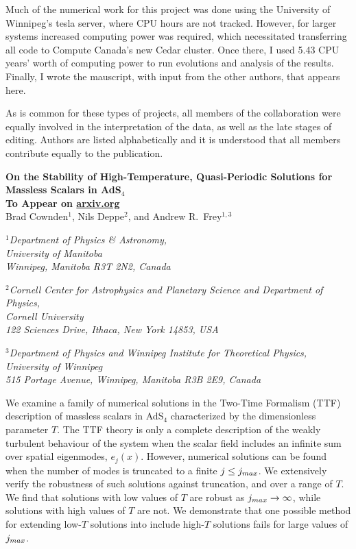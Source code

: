 \documentclass[../PhD.tex]{subfiles}
\begin{document}
Much of the numerical work for this project was done using the University of Winnipeg's tesla server, where CPU hours are not tracked. However, for larger systems increased computing power was required, which necessitated transferring all code to Compute Canada's new Cedar cluster. Once there, I used 5.43 CPU years' worth of computing power to run evolutions and analysis of the results. Finally, I wrote the mauscript, with input from the other authors, that appears here.

As is common for these types of projects, all members of the collaboration were equally involved in the interpretation of the data, as well as the late stages of editing. Authors are listed alphabetically and it is understood that all members contribute equally to the publication.

\newpage


\begin{center}
{\bf{\Large On the Stability of High-Temperature, Quasi-Periodic Solutions for Massless Scalars in AdS$_4$}} \\
\bigskip
{\bf To Appear on \href{https://arxiv.org}{arxiv.org}} \\
\bigskip
\bigskip
Brad Cownden$^1$, Nils Deppe$^2$, and Andrew R.~Frey$^{1,3}$\\
\bigskip

$^1${\it Department of Physics \& Astronomy,\\ University of Manitoba\\
Winnipeg, Manitoba R3T 2N2, Canada}
\vspace{0.1in}

$^2${\it Cornell Center for Astrophysics and Planetary Science and
Department of Physics,\\ Cornell University\\
122 Sciences Drive, Ithaca, New York 14853, USA}
\vspace{0.1in}

$^3${\it Department of Physics and Winnipeg Institute for Theoretical
Physics,\\ University of Winnipeg\\
515 Portage Avenue, Winnipeg, Manitoba R3B 2E9, Canada }
\end{center}

\bigskip

We examine a family of numerical solutions in the Two-Time Formalism (TTF) description of massless scalars in AdS$_4$ characterized by the dimensionless parameter $T$. The TTF theory is only a complete description of the weakly turbulent behaviour of the system when the scalar field includes an infinite sum over spatial eigenmodes, $e_j(x)$. However, numerical solutions can be found when the number of modes is truncated to a finite $j \leq j_{max}$. We extensively verify the robustness of such solutions against truncation, and over a range of $T$. We find that solutions with low values of $T$ are robust as $j_{max} \to \infty$, while solutions with high values of $T$ are not. We demonstrate that one possible method for extending low-$T$ solutions into include high-$T$ solutions fails for large values of $j_{max}$. 
\end{document}
